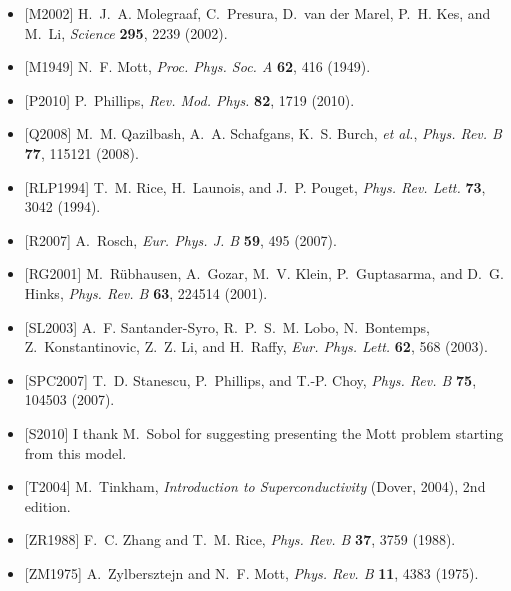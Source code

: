 \begin{itemize}[leftmargin=2em,itemsep=0pt,parsep=0pt,label={}]
\item {[M2002]} H.~J.~A. Molegraaf, C.~Presura, D.~van der Marel, P.~H. Kes, and M.~Li, \emph{Science} \textbf{295}, 2239 (2002).
\item {[M1949]} N.~F. Mott, \emph{Proc. Phys. Soc. A} \textbf{62}, 416 (1949).
\item {[P2010]} P.~Phillips, \emph{Rev. Mod. Phys.} \textbf{82}, 1719 (2010).
\item {[Q2008]} M.~M. Qazilbash, A.~A. Schafgans, K.~S. Burch, \emph{et al.}, \emph{Phys. Rev. B} \textbf{77}, 115121 (2008).
\item {[RLP1994]} T.~M. Rice, H.~Launois, and J.~P. Pouget, \emph{Phys. Rev. Lett.} \textbf{73}, 3042 (1994).
\item {[R2007]} A.~Rosch, \emph{Eur. Phys. J. B} \textbf{59}, 495 (2007).
\item {[RG2001]} M.~R\"{u}bhausen, A.~Gozar, M.~V. Klein, P.~Guptasarma, and D.~G. Hinks, \emph{Phys. Rev. B} \textbf{63}, 224514 (2001).
\item {[SL2003]} A.~F. Santander-Syro, R.~P.~S.~M. Lobo, N.~Bontemps, Z.~Konstantinovic, Z.~Z. Li, and H.~Raffy, \emph{Eur. Phys. Lett.} \textbf{62}, 568 (2003).
\item {[SPC2007]} T.~D. Stanescu, P.~Phillips, and T.-P. Choy, \emph{Phys. Rev. B} \textbf{75}, 104503 (2007).
\item {[S2010]} I thank M.~Sobol for suggesting presenting the Mott problem starting from this model.
\item {[T2004]} M.~Tinkham, \emph{Introduction to Superconductivity} (Dover, 2004), 2nd edition.
\item {[ZR1988]} F.~C. Zhang and T.~M. Rice, \emph{Phys. Rev. B} \textbf{37}, 3759 (1988).
\item {[ZM1975]} A.~Zylbersztejn and N.~F. Mott, \emph{Phys. Rev. B} \textbf{11}, 4383 (1975).
\end{itemize}
